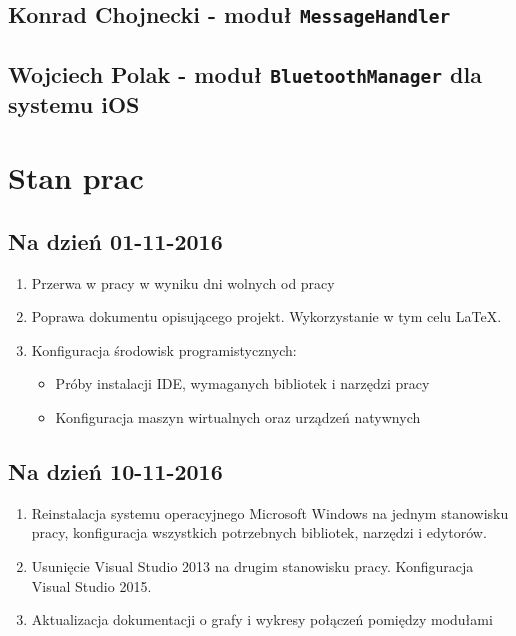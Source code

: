 \documentclass[a4paper, titlepage]{article}
\begin{document}
\subsection{Konrad Chojnecki - moduł \texttt{MessageHandler}}
\label{sec:org6085e76}
\subsection{Wojciech Polak - moduł \texttt{BluetoothManager} dla systemu iOS}
\label{sec:org9716bc0}
\section{Stan prac}
\label{sec:org370be41}
\subsection{Na dzień 01-11-2016}
\label{sec:org8ff9b79}
\begin{enumerate}
\item Przerwa w pracy w wyniku dni wolnych od pracy
\item Poprawa dokumentu opisującego projekt. Wykorzystanie w tym celu \LaTeX{}.
\item Konfiguracja środowisk programistycznych:
\begin{itemize}
\item Próby instalacji IDE, wymaganych bibliotek i narzędzi pracy
\item Konfiguracja maszyn wirtualnych oraz urządzeń natywnych
\end{itemize}
\end{enumerate}
\subsection{Na dzień 10-11-2016}
\label{sec:org124e069}
\begin{enumerate}
\item Reinstalacja systemu operacyjnego Microsoft Windows na jednym stanowisku pracy, konfiguracja wszystkich potrzebnych bibliotek, narzędzi i edytorów.
\item Usunięcie Visual Studio 2013 na drugim stanowisku pracy. Konfiguracja Visual Studio 2015.
\item Aktualizacja dokumentacji o grafy i wykresy połączeń pomiędzy modułami
\end{enumerate}
\end{document}
